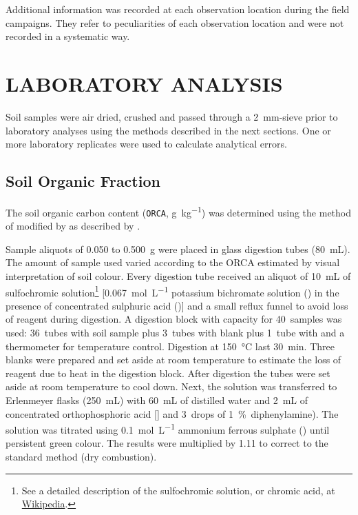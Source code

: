 Additional information was recorded at each observation location during the field campaigns. They refer to 
peculiarities of each observation location and were not recorded in a systematic way.

\section{LABORATORY ANALYSIS}
\label{sec:chap04-laboratory}

Soil samples were air dried, crushed and passed through a \SI{2}{\milli\metre}-sieve prior to laboratory 
analyses using the methods described in the next sections. One or more laboratory replicates were used to 
calculate analytical errors.

\subsection{Soil Organic Fraction}
\label{sec:chap04-organic}

The soil organic carbon content (\texttt{ORCA}, \si{\gram\per\kilo\gram}) was determined using the method of
 modified by  as described by .

\def\footsulfochromic{\footnote{See a detailed description of the sulfochromic solution, or chromic acid, at 
\href{http://en.wikipedia.org/wiki/Chromic_acid}{Wikipedia}.}}

Sample aliquots of \num{0.050} to \SI{0.500}{\gram} were placed in glass digestion tubes 
(\SI{80}{\milli\liter}). The amount of sample used varied according to the ORCA estimated by visual 
interpretation of soil colour. Every digestion tube received an aliquot of \SI{10}{\milli\liter} of 
sulfochromic solution\footsulfochromic{} [\SI{0.067}{\mole\per\liter} potassium bichromate solution
() in the presence of concentrated sulphuric acid ()] and a small reflux funnel 
to avoid loss of reagent during digestion. A digestion block with capacity for \num{40}~samples was used:
\num{36}~tubes with soil sample plus \num{3}~tubes with blank plus \num{1}~tube with  and a
thermometer for temperature control. Digestion at \SI{150}{\celsius} last \SI{30}{\minute}. Three blanks 
were prepared and set aside at room temperature to estimate the loss of reagent due to heat in the digestion 
block. After digestion the tubes were set aside at room temperature to cool down. Next, the solution was 
transferred to Erlenmeyer flasks (\SI{250}{\milli\liter}) with \SI{60}{\milli\liter} of distilled water and
\SI{2}{\milli\liter} of concentrated orthophosphoric acid [] and \num{3}~drops of 
\SI{1}{\percent}~diphenylamine). The solution was titrated using \SI{0.1}{\mole\per\liter} ammonium ferrous
sulphate () until persistent green colour. The results were multiplied by \num{1.11}
to correct to the standard method (dry combustion).

